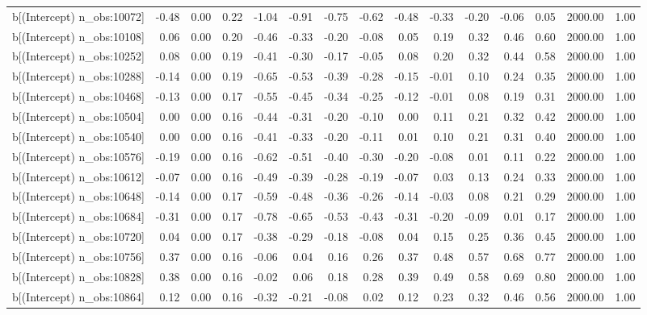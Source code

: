\begin{table}[ht]
\begin{tabular}{rrrrrrrrrrrrrrr}
  b[(Intercept) n\_obs:10072] & -0.48 & 0.00 & 0.22 & -1.04 & -0.91 & -0.75 & -0.62 & -0.48 & -0.33 & -0.20 & -0.06 & 0.05 & 2000.00 & 1.00 \\ 
  b[(Intercept) n\_obs:10108] & 0.06 & 0.00 & 0.20 & -0.46 & -0.33 & -0.20 & -0.08 & 0.05 & 0.19 & 0.32 & 0.46 & 0.60 & 2000.00 & 1.00 \\ 
  b[(Intercept) n\_obs:10252] & 0.08 & 0.00 & 0.19 & -0.41 & -0.30 & -0.17 & -0.05 & 0.08 & 0.20 & 0.32 & 0.44 & 0.58 & 2000.00 & 1.00 \\ 
  b[(Intercept) n\_obs:10288] & -0.14 & 0.00 & 0.19 & -0.65 & -0.53 & -0.39 & -0.28 & -0.15 & -0.01 & 0.10 & 0.24 & 0.35 & 2000.00 & 1.00 \\ 
  b[(Intercept) n\_obs:10468] & -0.13 & 0.00 & 0.17 & -0.55 & -0.45 & -0.34 & -0.25 & -0.12 & -0.01 & 0.08 & 0.19 & 0.31 & 2000.00 & 1.00 \\ 
  b[(Intercept) n\_obs:10504] & 0.00 & 0.00 & 0.16 & -0.44 & -0.31 & -0.20 & -0.10 & 0.00 & 0.11 & 0.21 & 0.32 & 0.42 & 2000.00 & 1.00 \\ 
  b[(Intercept) n\_obs:10540] & 0.00 & 0.00 & 0.16 & -0.41 & -0.33 & -0.20 & -0.11 & 0.01 & 0.10 & 0.21 & 0.31 & 0.40 & 2000.00 & 1.00 \\ 
  b[(Intercept) n\_obs:10576] & -0.19 & 0.00 & 0.16 & -0.62 & -0.51 & -0.40 & -0.30 & -0.20 & -0.08 & 0.01 & 0.11 & 0.22 & 2000.00 & 1.00 \\ 
  b[(Intercept) n\_obs:10612] & -0.07 & 0.00 & 0.16 & -0.49 & -0.39 & -0.28 & -0.19 & -0.07 & 0.03 & 0.13 & 0.24 & 0.33 & 2000.00 & 1.00 \\ 
  b[(Intercept) n\_obs:10648] & -0.14 & 0.00 & 0.17 & -0.59 & -0.48 & -0.36 & -0.26 & -0.14 & -0.03 & 0.08 & 0.21 & 0.29 & 2000.00 & 1.00 \\ 
  b[(Intercept) n\_obs:10684] & -0.31 & 0.00 & 0.17 & -0.78 & -0.65 & -0.53 & -0.43 & -0.31 & -0.20 & -0.09 & 0.01 & 0.17 & 2000.00 & 1.00 \\ 
  b[(Intercept) n\_obs:10720] & 0.04 & 0.00 & 0.17 & -0.38 & -0.29 & -0.18 & -0.08 & 0.04 & 0.15 & 0.25 & 0.36 & 0.45 & 2000.00 & 1.00 \\ 
  b[(Intercept) n\_obs:10756] & 0.37 & 0.00 & 0.16 & -0.06 & 0.04 & 0.16 & 0.26 & 0.37 & 0.48 & 0.57 & 0.68 & 0.77 & 2000.00 & 1.00 \\ 
  b[(Intercept) n\_obs:10828] & 0.38 & 0.00 & 0.16 & -0.02 & 0.06 & 0.18 & 0.28 & 0.39 & 0.49 & 0.58 & 0.69 & 0.80 & 2000.00 & 1.00 \\ 
  b[(Intercept) n\_obs:10864] & 0.12 & 0.00 & 0.16 & -0.32 & -0.21 & -0.08 & 0.02 & 0.12 & 0.23 & 0.32 & 0.46 & 0.56 & 2000.00 & 1.00 \\ 

\end{tabular}
\end{table}
